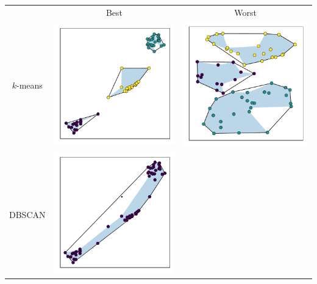 \documentclass[a0paper]{betterposter}
\begin{document}
{\vspace{-1.5em}\begin{center}
    \begin{minipage}{.8\linewidth}
        \begin{tabular}{ccc}
            {} & Best & Worst\\
            \begin{turn}{90}\qquad\(k\)-means\end{turn} &
            \includegraphics[width=.45\linewidth]{img/kmeans_best.pdf} &
            \includegraphics[width=.45\linewidth]{img/kmeans_worst.pdf}\\
            \begin{turn}{90}\qquad DBSCAN\end{turn} &
            \includegraphics[width=.45\linewidth]{img/dbscan_best.pdf} &

\end{tabular}
\end{minipage}
\end{center}}
\end{document}
